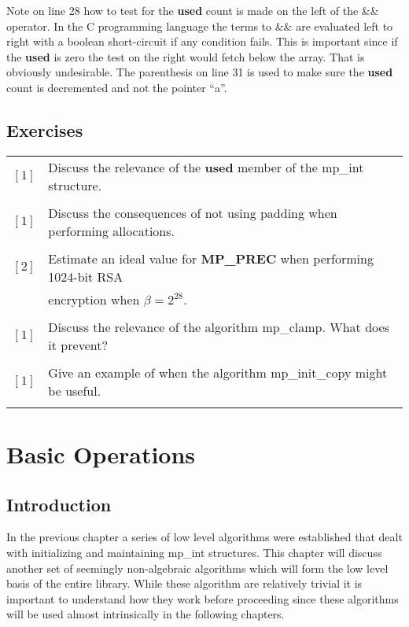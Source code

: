 \documentclass[b5paper]{book}
\begin{document}
Note on line 28 how to test for the \textbf{used} count is made on the left of the \&\& operator.  In the C programming
language the terms to \&\& are evaluated left to right with a boolean short-circuit if any condition fails.  This is 
important since if the \textbf{used} is zero the test on the right would fetch below the array.  That is obviously 
undesirable.  The parenthesis on line 31 is used to make sure the \textbf{used} count is decremented and not
the pointer ``a''.  

\section*{Exercises}
\begin{tabular}{cl}
$\left [ 1 \right ]$ & Discuss the relevance of the \textbf{used} member of the mp\_int structure. \\
                     & \\
$\left [ 1 \right ]$ & Discuss the consequences of not using padding when performing allocations.  \\
                     & \\
$\left [ 2 \right ]$ & Estimate an ideal value for \textbf{MP\_PREC} when performing 1024-bit RSA \\
                     & encryption when $\beta = 2^{28}$.  \\
                     & \\
$\left [ 1 \right ]$ & Discuss the relevance of the algorithm mp\_clamp.  What does it prevent? \\
                     & \\
$\left [ 1 \right ]$ & Give an example of when the algorithm  mp\_init\_copy might be useful. \\
                     & \\
\end{tabular}



\chapter{Basic Operations}

\section{Introduction}
In the previous chapter a series of low level algorithms were established that dealt with initializing and maintaining
mp\_int structures.  This chapter will discuss another set of seemingly non-algebraic algorithms which will form the low 
level basis of the entire library.  While these algorithm are relatively trivial it is important to understand how they
work before proceeding since these algorithms will be used almost intrinsically in the following chapters.
\end{document}
